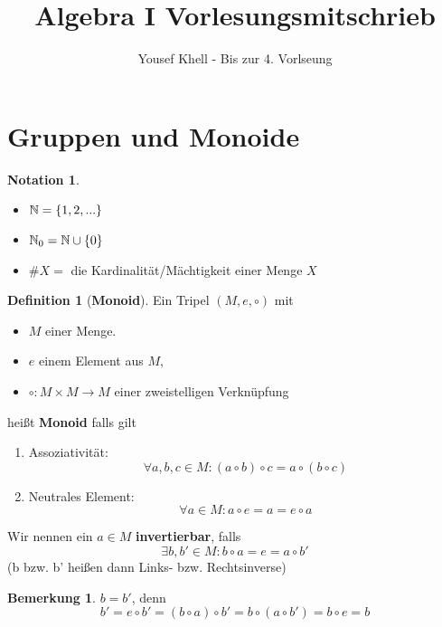 \documentclass[a4paper]{article}
\title{\vspace{-2cm} Algebra I Vorlesungsmitschrieb}
\author{Yousef Khell - Bis zur 4. Vorlseung}
\theoremstyle{plain}
\theoremstyle{definition}
\newtheorem{defi}[thm]{Definition}
\newtheorem*{bem*}{Bemerkung}
\newtheorem*{nota*}{Notation}
\begin{document}
\maketitle
\tableofcontents

\section{Gruppen und Monoide}%
\label{sec:Gruppen und Monoide}
\begin{nota*} \item
\begin{itemize}
  \item $\Bbb N = \{1, 2, ...\}$
  \item $\Bbb N_{0} = \Bbb N \cup \{0\}$
\item $\#X = $ die Kardinalität/Mächtigkeit einer Menge $X$
\end{itemize}
\end{nota*}

\begin{defi}[\textbf{Monoid}] %
  Ein Tripel $(M, e, \circ)$ mit
  \begin{itemize}
 \item $M$ einer Menge.
 \item $e$ einem Element aus $M$,
 \item $\circ : M \times M \to M$ einer zweistelligen Verknüpfung
  \end{itemize}
  heißt \textbf{Monoid} falls gilt
  \begin{enumerate}[(M1)]
 \item Assoziativität: $$\forall a, b, c \in M : (a \circ b) \circ c = a \circ (b \circ c)$$
 \item Neutrales Element: $$\forall a \in M : a \circ e = a = e \circ a$$
  \end{enumerate}
  Wir nennen ein $a \in M$ \textbf{invertierbar}, falls $$\exists b, b' \in M : b \circ a = e = a \circ b'$$ (b bzw. b' heißen dann Links- bzw. Rechtsinverse)
 \begin{bem*}
$b = b'$, denn $$b' = e \circ b' = (b\circ a) \circ b' = b \circ (a \circ b') = b \circ e = b$$
 \end{bem*}
\end{defi}
\end{document}
